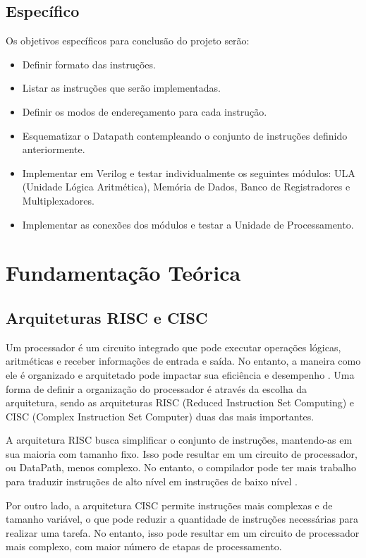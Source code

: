 \documentclass[
	12pt,				%
	openright,			%
	a4paper,			%
	english,			%
	french,				%
	spanish,			%
	brazil,				%
	]{abntex2}
\begin{document}
\section{Específico}
Os objetivos específicos para conclusão do projeto serão:
\begin{itemize}
    \item Definir formato das instruções.
    \item Listar as instruções que serão implementadas.
    \item Definir os modos de endereçamento para cada instrução.
    \item Esquematizar o Datapath contempleando o conjunto de instruções definido anteriormente.
    \item Implementar em Verilog e testar individualmente os seguintes módulos: ULA (Unidade Lógica Aritmética), Memória de Dados, Banco de Registradores e Multiplexadores.
    \item Implementar as conexões dos módulos e testar a Unidade de Processamento.
\end{itemize}

\chapter{Fundamentação Teórica}
\section{Arquiteturas RISC e CISC}
Um processador é um circuito integrado que pode executar operações lógicas, aritméticas e receber informações de entrada e saída. No entanto, a maneira como ele é organizado e arquitetado pode impactar sua eficiência e desempenho  \cite{stallings2017}. Uma forma de definir a organização do processador é através da escolha da arquitetura, sendo as arquiteturas RISC (Reduced Instruction Set Computing) e CISC (Complex Instruction Set Computer) duas das mais importantes.

A arquitetura RISC busca simplificar o conjunto de instruções, mantendo-as em sua maioria com tamanho fixo. Isso pode resultar em um circuito de processador, ou DataPath, menos complexo. No entanto, o compilador pode ter mais trabalho para traduzir instruções de alto nível em instruções de baixo nível \cite{tanenbaum2015}.

Por outro lado, a arquitetura CISC permite instruções mais complexas e de tamanho variável, o que pode reduzir a quantidade de instruções necessárias para realizar uma tarefa. No entanto, isso pode resultar em um circuito de processador mais complexo, com maior número de etapas de processamento.
\end{document}
